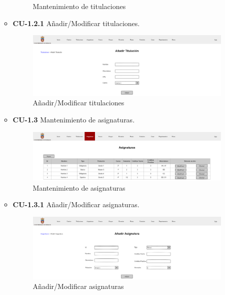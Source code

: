 \begin{itemize}
\begin{itemize}
\begin{figure}[!h]
		\caption{Mantenimiento de titulaciones}
		\end{figure}
		\FloatBarrier
		\item \textbf{CU-1.2.1} Añadir/Modificar titulaciones.
		\begin{figure}[!h]
		\centering
		\includegraphics[width=\textwidth]{../img/Anexos/Vistas/add_titulacion.png}
		\caption{Añadir/Modificar titulaciones}
		\end{figure}
		\FloatBarrier
\newpage
		\item \textbf{CU-1.3} Mantenimiento de asignaturas.
		\begin{figure}[!h]
		\centering
		\includegraphics[width=\textwidth]{../img/Anexos/Vistas/asignaturas.png}
		\caption{Mantenimiento de asignaturas}
		\end{figure}
		\FloatBarrier
		\item \textbf{CU-1.3.1} Añadir/Modificar asignaturas.
		\begin{figure}[!h]
		\centering
		\includegraphics[width=\textwidth]{../img/Anexos/Vistas/add_asignatura.png}
		\caption{Añadir/Modificar asignaturas}
		\end{figure}
		\FloatBarrier
	\end{itemize}
	

\end{itemize}
